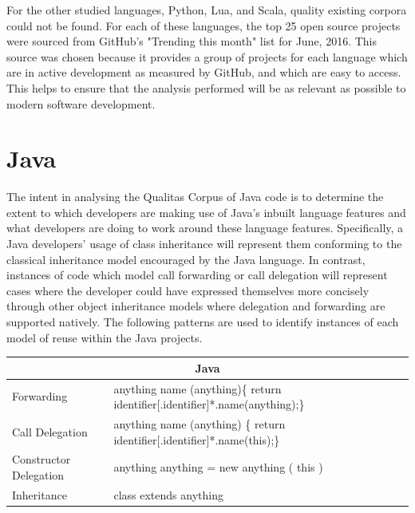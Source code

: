 For the other studied languages, Python, Lua, and Scala, quality existing corpora could not be found. For each of these languages, the top 25 open source projects were sourced from GitHub's "Trending this month" list for June, 2016. This source was chosen because it provides a group of projects for each language which are in active development as measured by GitHub, and which are easy to access. This helps to ensure that the analysis performed will be as relevant as possible to modern software development.

\section{Java}
The intent in analysing the Qualitas Corpus of Java code is to determine the extent to which developers are making use of Java's inbuilt language features and what developers are doing to work around these language features. Specifically, a Java developers' usage of class inheritance will represent them conforming to the classical inheritance model encouraged by the Java language. In contrast, instances of code which model call forwarding or call delegation will represent cases where the developer could have expressed themselves more concisely through other object inheritance models where delegation and forwarding are supported natively. The following patterns are used to identify instances of each model of reuse within the Java projects.
\newline

\begin{tabular}{|p{5cm}|p{9cm}|}
	\hline
	\multicolumn{2}{|c|}{Java}                                                                                                                                               \\ \hline
	Forwarding                     & anything name (anything)\{ \newline  \hphantom{----}return identifier{[}.identifier{]}*.name(anything);\newline \}  \\ \hline
	Call Delegation                     & anything name (anything) \{ \newline   \hphantom{----}return identifier{[}.identifier{]}*.name(this);\newline \}  \\ \hline
	Constructor Delegation & anything anything = new anything ( this )                                                                                                  \\ \hline
	Inheritance                    & class extends anything                                                                                                                                         \\ \hline
\end{tabular}\newline\newline\newline

